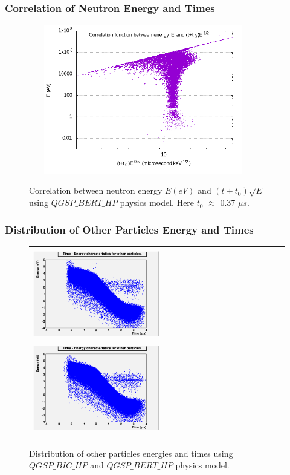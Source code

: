\documentclass{beamer}
\begin{document}
    \begin{frame}
        \frametitle{Correlation of Neutron Energy and Times}
        \begin{figure}
            \includegraphics[height=65mm, width=100mm]{../PICS/NeutEnergyTimeCorrBERT.png} \label{fig:NeutETCorrBERT}
            \vskip -5mm                        
            \caption{Correlation between neutron energy $E (eV)$ and $(t+t_0)\sqrt{E}$ using  $QGSP\_BERT\_HP$ physics model. Here $t_0$ $\approx$ 0.37 $\mu s$.}
        \end{figure}
    \end{frame}

    \begin{frame}
        \frametitle{Distribution of Other Particles Energy and Times}
        \begin{figure}
            \begin{tabular}{ll}
                \includegraphics[height=40mm, width=55mm]{../PICS/OtherEnergyTimeBIC.png}
                \label{fig:othETBIC}
                \includegraphics[height=40mm, width=55mm]{../PICS/OtherEnergyTimeBERT.png}
                \label{fig:othETBERT}
            \end{tabular}
            \caption{Distribution of other particles energies and times using $QGSP\_BIC\_HP$ and $QGSP\_BERT\_HP$ physics model.}
        \end{figure}
    \end{frame}
\end{document}
